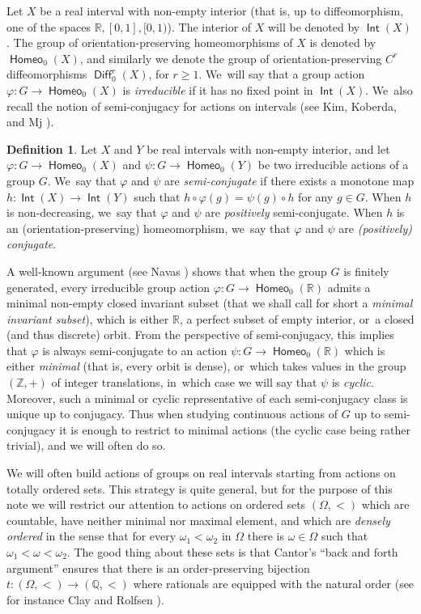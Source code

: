 \documentclass[JEP,XML,SOM,Unicode,NoFloatCountersInSection,published]{cedram}
\theoremstyle{definition}
\newtheorem{dfn}[thm]{Definition}
\DeclareMathOperator{\Diff}{\mathsf{Diff}}
\DeclareMathOperator{\homeo}{\mathsf{Homeo}}
\DeclareMathOperator{\Int}{\mathsf{Int}}
\newcommand{\R}{\mathbb{R}}
\newcommand{\Q}{\mathbb Q}
\newcommand{\Z}{\mathbb Z}
\begin{document}
Let $X$ be a real interval with non-empty interior (that is, up to diffeomorphism, one of the spaces $\R, [0,1], [0, 1)$). The interior of $X$ will be denoted by $\Int(X)$. The group of orientation-preserving homeomorphisms of $X$ is denoted by $\homeo_0(X)$, and similarly we denote the group of orientation-preserving $C^r$ diffeomorphisms $\Diff_0^r(X)$, for $r\ge 1$. We~will say that a group action $\varphi\colon G\to \homeo_0(X)$ is \emph{irreducible} if it has no fixed point in $\Int(X)$. We~also recall the notion of semi-conjugacy for actions on intervals (see Kim, Koberda, and Mj \cite{KKMj}).
\begin{dfn}
Let $X$ and $Y$ be real intervals with non-empty interior, and let $\varphi\colon G\to \homeo_0(X)$ and $\psi\colon G\to \homeo_0(Y)$ be two irreducible actions of a group $G$. We~say that $\varphi$ and $\psi$ are \emph{semi-conjugate} if there exists a monotone map $h\colon \Int(X)\to \Int(Y)$ such that $h\circ\varphi(g)=\psi(g)\circ h$ for any $g\in G$. When $h$ is non-decreasing, we~say that $\varphi$ and $\psi$ are \emph{positively} semi-conjugate. When $h$ is an (orientation-preserving) homeomorphism, we~say that $\varphi$ and $\psi$ are \emph{(positively) conjugate}.
\end{dfn}

A well-known argument (see Navas \cite[Prop.\,2.1.12]{Navas-book}) shows that when the group $G$ is finitely generated, every irreducible group action $\varphi\colon G\to \homeo_0(\R)$ admits a minimal non-empty closed invariant subset (that we shall call for short a \emph{minimal invariant subset}), which is either $\R$, a perfect subset of empty interior, or~a closed (and thus discrete) orbit. From the perspective of semi-conjugacy, this implies that $\varphi$ is always semi-conjugate to an action $\psi\colon G\to \homeo_0(\R)$ which is either \emph{minimal} (that is, every orbit is dense), or~which takes values in the group~$(\Z, +)$ of integer translations, in~which case we will say that $\psi$ is \emph{cyclic}. Moreover, such a minimal or cyclic representative of each semi-conjugacy class is unique up to conjugacy. Thus when studying continuous actions of $G$ up to semi-conjugacy it is enough to restrict to minimal actions (the cyclic case being rather trivial), and we will often do so.

We will often build actions of groups on real intervals starting from actions on totally ordered sets. This strategy is quite general, but for the purpose of this note we will restrict our attention to actions on ordered sets $(\Omega,<)$ which are countable, have neither minimal nor maximal element, and which are \emph{densely ordered} in the sense that for every $\omega_1<\omega_2$ in $\Omega$ there is $\omega\in \Omega$ such that $\omega_1<\omega<\omega_2$. The good thing about these sets is that Cantor's ``back and forth argument'' ensures that there is an order-preserving bijection $t\colon (\Omega,<)\to (\Q,<)$ where rationals are equipped with the natural order (see for instance Clay and Rolfsen \cite[Th.\,2.22]{ClayRolfsen}).
\end{document}
